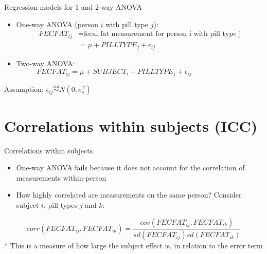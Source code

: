 \documentclass[
  ignorenonframetext,
]{beamer}
\providecommand{\tightlist}{%
  \setlength{\itemsep}{0pt}\setlength{\parskip}{0pt}}
\begin{document}
\begin{frame}{Regression models for 1 and 2-way ANOVA}
\protect\hypertarget{regression-models-for-1-and-2-way-anova-1}{}

\begin{itemize}
\item
  One-way ANOVA (person \(i\) with pill type \(j\)): \begin{equation*}
  \begin{aligned}
  FECFAT_{ij} &= \textrm{fecal fat measurement for person i with pill type j} \\
            &= \mu + PILLTYPE_j + \epsilon_{ij}
  \end{aligned}
  \end{equation*}
\item
  Two-way ANOVA: \begin{equation*}
  FECFAT_{ij} = \mu + SUBJECT_i + PILLTYPE_j + \epsilon_{ij}
  \phantom{\hspace{3cm}}
  \end{equation*}
\end{itemize}

Assumption:
\(\epsilon_{ij} \stackrel{iid}{\sim} N(0, \sigma_\epsilon^2)\)

\end{frame}

\hypertarget{correlations-within-subjects-icc}{%
\section{Correlations within subjects
(ICC)}\label{correlations-within-subjects-icc}}

\begin{frame}{Correlations within subjects}
\protect\hypertarget{correlations-within-subjects}{}

\begin{itemize}
\tightlist
\item
  One-way ANOVA fails because it does not account for the correlation of
  measurements within-person
\item
  How highly correlated are measurements on the same person? Consider
  subject \(i\), pill types \(j\) and \(k\):
\end{itemize}

\begin{equation*}
corr(FECFAT_{ij}, FECFAT_{ik}) = 
          \frac{cov(FECFAT_{ij}, FECFAT_{ik})}
               {sd(FECFAT_{ij}) sd(FECFAT_{ik})}
\end{equation*} * This is a measure of how large the subject effect is,
in relation to the error term

\end{frame}
\end{document}
